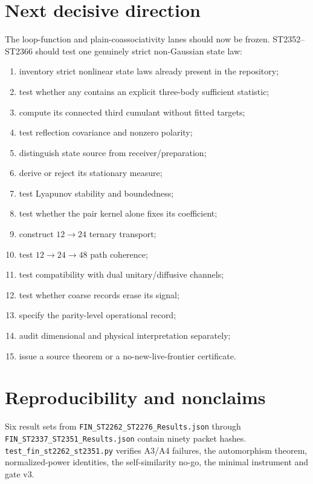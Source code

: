 \documentclass[11pt,a4paper]{article}
\begin{document}
\section{Next decisive direction}

The loop-function and plain-coassociativity lanes should now be frozen.
ST2352--ST2366 should test one genuinely strict non-Gaussian state law:

\begin{enumerate}[label=\textbf{ST\arabic*}, start=2352]
\item inventory strict nonlinear state laws already present in the repository;
\item test whether any contains an explicit three-body sufficient statistic;
\item compute its connected third cumulant without fitted targets;
\item test reflection covariance and nonzero polarity;
\item distinguish state source from receiver/preparation;
\item derive or reject its stationary measure;
\item test Lyapunov stability and boundedness;
\item test whether the pair kernel alone fixes its coefficient;
\item construct \(12\to24\) ternary transport;
\item test \(12\to24\to48\) path coherence;
\item test compatibility with dual unitary/diffusive channels;
\item test whether coarse records erase its signal;
\item specify the parity-level operational record;
\item audit dimensional and physical interpretation separately;
\item issue a source theorem or a no-new-live-frontier certificate.
\end{enumerate}

\section{Reproducibility and nonclaims}

Six result sets from
\texttt{FIN\_ST2262\_ST2276\_Results.json} through
\texttt{FIN\_ST2337\_ST2351\_Results.json} contain ninety packet hashes.
\texttt{test\_fin\_st2262\_st2351.py} verifies A3/A4 failures, the automorphism
theorem, normalized-power identities, the self-similarity no-go, the minimal
instrument and gate v3.
\end{document}
